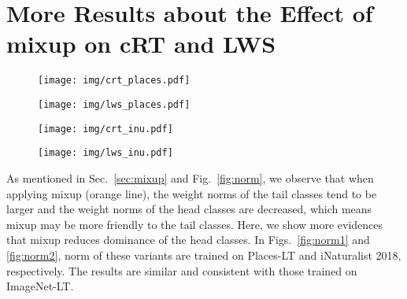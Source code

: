 \documentclass[final]{cvpr}
\begin{document}
	\clearpage
	
	\section{More Results about the Effect of mixup on cRT and LWS}
	
	\begin{figure*}[h]
		\centering
		\begin{subfigure}{0.48\linewidth}
			\texttt{[image: img/crt\_places.pdf]}
		\end{subfigure}
		\hfill
		\begin{subfigure}{0.48\linewidth}
			\texttt{[image: img/lws\_places.pdf]}
		\end{subfigure}
		\vspace{-2pt}
		\caption{Classifier weight norms for the Places-LT evaluation set (365 classes in total) when classes are sorted by descending values of , where  denotes the number of training sample for
			Class-. Left: weight norms of cRT with/without mixup. Right: weight norms of LWS with/without mixup. Light shade: true norm. Dark lines: smooth version. \textit{Best viewed on screen}.}
		\label{fig:norm1}
		
	\end{figure*}
	
	\begin{figure*}[h]
		\centering
		\begin{subfigure}{0.48\linewidth}
			\texttt{[image: img/crt\_inu.pdf]}
		\end{subfigure}
		\hfill
		\begin{subfigure}{0.48\linewidth}
			\texttt{[image: img/lws\_inu.pdf]}
		\end{subfigure}
		\caption{Classifier weight norms for the iNaturalist 2018 validation set (8,142 classes in total) when classes are sorted by descending values of , where  denotes the number of training sample for Class-. Left: weight norms of cRT with or without mixup. Right: weight norms of LWS with or without mixup. Light shade: true norm. Dark lines: smooth version. \textit{Best viewed on screen}.}
		\label{fig:norm2}
	\end{figure*}
	
	As mentioned in Sec.~\ref{sec:mixup} and Fig.~\ref{fig:norm}, we observe that when applying mixup (orange line), the weight norms of the tail classes tend to be larger and the weight norms of the head classes are decreased, which means mixup may be more friendly to the tail classes. Here, we show more evidences that mixup reduces dominance of the head classes. In Figs.~\ref{fig:norm1} and \ref{fig:norm2}, norm of these variants are trained on Places-LT and iNaturalist 2018, respectively. The results are similar and consistent with those trained on ImageNet-LT.
	
	
	
\end{document}
